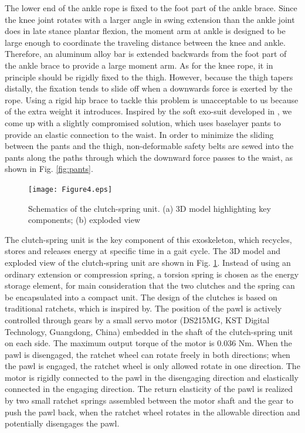\documentclass[twocolumn,cleanfoot,10pt]{asme2ej}
\begin{document}
The lower end of the ankle rope is fixed to the foot part of the ankle brace.
Since the knee joint rotates with a larger angle in swing extension than the ankle joint does in late stance plantar flexion, the moment arm at ankle is designed to be large enough to coordinate the traveling distance between the knee and ankle.
Therefore, an aluminum alloy bar is extended backwards from the foot part of the ankle brace to provide a large moment arm.
As for the knee rope, it in principle should be rigidly fixed to the thigh.
However, because the thigh tapers distally, the fixation tends to slide off when a downwards force is exerted by the rope.
Using a rigid hip brace to tackle this problem is unacceptable to us because of the extra weight it introduces.
Inspired by the soft exo-suit developed in \cite{RN20}, we come up with a slightly compromised solution, which uses baselayer pants to provide an elastic connection to the waist.
In order to minimize the sliding between the pants and the thigh, non-deformable safety belts are sewed into the pants along the paths through which the downward force passes to the waist, as shown in Fig. \ref{fig:pants}.

\begin{figure}[t]
	\centering
	\texttt{[image: Figure4.eps]}
	\caption{Schematics of the clutch-spring unit. (a) 3D model highlighting key components; (b) exploded view}
	\label{fig:clutch}   
\end{figure}

The clutch-spring unit is the key component of this exoskeleton, which recycles, stores and releases energy at specific time in a gait cycle.
The 3D model and exploded view of the clutch-spring unit are shown in Fig. \ref{fig:clutch}.
Instead of using an ordinary extension or compression spring, a torsion spring is chosen as the energy storage element, for main consideration that the two clutches and the spring can be encapsulated into a compact unit.
The design of the clutches is based on traditional ratchets, which is inspired by\cite{RN19}.
The position of the pawl is actively controlled through gears by a small servo motor (DS215MG, KST Digital Technology, Guangdong, China) embedded in the shaft of the clutch-spring unit on each side.
The maximum output torque of the motor is 0.036 Nm.
When the pawl is disengaged, the ratchet wheel can rotate freely in both directions; when the pawl is engaged, the ratchet wheel is only allowed rotate in one direction.
The motor is rigidly connected to the pawl in the disengaging direction and elastically connected in the engaging direction.
The return elasticity of the pawl is realized by two small ratchet springs assembled between the motor shaft and the gear to push the pawl back, when the ratchet wheel rotates in the allowable direction and potentially disengages the pawl.
\end{document}
